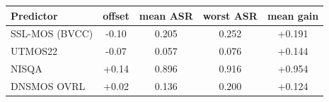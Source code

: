 \begin{tabular}{l c c c c}
\toprule
Predictor & offset & mean ASR & worst ASR & mean gain \\
\midrule
SSL-MOS (BVCC) & -0.10 & 0.205 & 0.252 & +0.191 \\
UTMOS22 & -0.07 & 0.057 & 0.076 & +0.144 \\
NISQA & +0.14 & 0.896 & 0.916 & +0.954 \\
DNSMOS OVRL & +0.02 & 0.136 & 0.200 & +0.124 \\
\bottomrule
\end{tabular}
